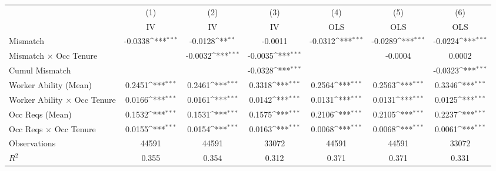 {
\def\sym#1{\ifmmode^{#1}\else\(^{#1}\)\fi}
\begin{tabular}{l*{6}{c}}
\hline  
                    &\multicolumn{1}{c}{(1)}&\multicolumn{1}{c}{(2)}&\multicolumn{1}{c}{(3)}&\multicolumn{1}{c}{(4)}&\multicolumn{1}{c}{(5)}&\multicolumn{1}{c}{(6)}\\
                    &\multicolumn{1}{c}{IV}&\multicolumn{1}{c}{IV}&\multicolumn{1}{c}{IV}&\multicolumn{1}{c}{OLS}&\multicolumn{1}{c}{OLS}&\multicolumn{1}{c}{OLS}\\
\hline  
Mismatch            &     -0.0338\sym{***}&     -0.0128\sym{**} &     -0.0011         &     -0.0312\sym{***}&     -0.0289\sym{***}&     -0.0224\sym{***}\\
[1em]
Mismatch $\times$ Occ Tenure&                     &     -0.0032\sym{***}&     -0.0035\sym{***}&                     &     -0.0004         &      0.0002         \\
[1em]
Cumul Mismatch      &                     &                     &     -0.0328\sym{***}&                     &                     &     -0.0323\sym{***}\\
[1em]
Worker Ability (Mean)&      0.2451\sym{***}&      0.2461\sym{***}&      0.3318\sym{***}&      0.2564\sym{***}&      0.2563\sym{***}&      0.3346\sym{***}\\
[1em]
Worker Ability $\times$ Occ Tenure&      0.0166\sym{***}&      0.0161\sym{***}&      0.0142\sym{***}&      0.0131\sym{***}&      0.0131\sym{***}&      0.0125\sym{***}\\
[1em]
Occ Reqs (Mean)     &      0.1532\sym{***}&      0.1531\sym{***}&      0.1575\sym{***}&      0.2106\sym{***}&      0.2105\sym{***}&      0.2237\sym{***}\\
[1em]
Occ Reqs $\times$ Occ Tenure&      0.0155\sym{***}&      0.0154\sym{***}&      0.0163\sym{***}&      0.0068\sym{***}&      0.0068\sym{***}&      0.0061\sym{***}\\
\hline  
Observations        &       44591         &       44591         &       33072         &       44591         &       44591         &       33072         \\
\(R^{2}\)           &       0.355         &       0.354         &       0.312         &       0.371         &       0.371         &       0.331         \\
\hline  
\end{tabular}
}
